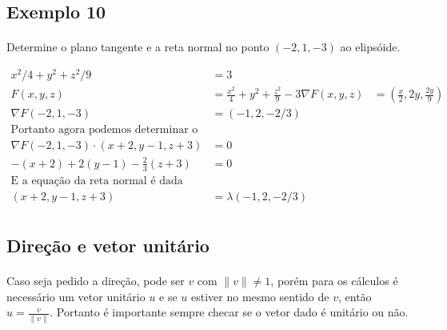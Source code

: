 \documentclass{article}
\newcommand{\norm}[1] {\left.\parallel #1 \right.\parallel}
\begin{document}
        \subsection{Exemplo 10}
            \paragraph{}
            Determine o plano tangente e a reta normal no ponto $(-2, 1, -3)$ ao elipsóide.

            \begin{align*}
                x^2 / 4 + y^2 + z^2 / 9 &= 3\\
                F(x, y, z) &= \frac{x^2}{4} + y^2 + \frac{z^2}{9} - 3
                \nabla F(x, y, z) &= \left( \frac{x}{2}, 2y, \frac{2y}{9} \right)\\
                \nabla F(-2, 1, -3) &= (-1, 2, -2/3)\\
                \text{Portanto agora podemos determinar o plano tangente}\\
                \nabla F(-2, 1, -3) \cdot (x + 2, y - 1, z + 3) &= 0\\
                -(x + 2) + 2(y-1) - \frac{2}{3}(z + 3) &= 0\\
                \text{E a equação da reta normal é dada por}\\
                (x + 2, y - 1, z + 3) &= \lambda (-1, 2, -2/3)\\
            \end{align*}

    \begin{appendix}
        \section{Direção e vetor unitário}
            \paragraph{}
            Caso seja pedido a direção, pode ser $v$ com $\norm{v} \neq 1$, porém para os cálculos é necessário um vetor unitário $u$ e se
            $u$ estiver no mesmo sentido de $v$, então $u = \frac{v}{\norm{v}}$. Portanto é importante sempre checar se o vetor dado é unitário
            ou não.
    \end{appendix}
\end{document}
